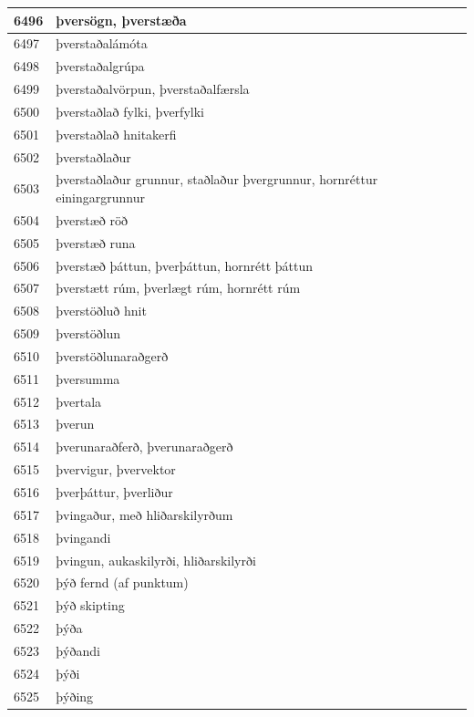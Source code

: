 \begin{longtable}{p{}|p{}|p{}|p{}|p{}}
6496 & þversögn, þverstæða &  &  &  \\
\hline
6497 & þverstaðalámóta &  &  &  \\
\hline
6498 & þverstaðalgrúpa &  &  &  \\
\hline
6499 & þverstaðalvörpun, þverstaðalfærsla &  &  &  \\
\hline
6500 & þverstaðlað fylki, þverfylki &  &  &  \\
\hline
6501 & þverstaðlað hnitakerfi &  &  &  \\
\hline
6502 & þverstaðlaður &  &  &  \\
\hline
6503 & þverstaðlaður grunnur, staðlaður þvergrunnur, hornréttur einingargrunnur &  &  &  \\
\hline
6504 & þverstæð röð &  &  &  \\
\hline
6505 & þverstæð runa &  &  &  \\
\hline
6506 & þverstæð þáttun, þverþáttun, hornrétt þáttun &  &  &  \\
\hline
6507 & þverstætt rúm, þverlægt rúm, hornrétt rúm &  &  &  \\
\hline
6508 & þverstöðluð hnit &  &  &  \\
\hline
6509 & þverstöðlun &  &  &  \\
\hline
6510 & þverstöðlunaraðgerð &  &  &  \\
\hline
6511 & þversumma &  &  &  \\
\hline
6512 & þvertala &  &  &  \\
\hline
6513 & þverun &  &  &  \\
\hline
6514 & þverunaraðferð, þverunaraðgerð &  &  &  \\
\hline
6515 & þvervigur, þvervektor &  &  &  \\
\hline
6516 & þverþáttur, þverliður &  &  &  \\
\hline
6517 & þvingaður, með hliðarskilyrðum &  &  &  \\
\hline
6518 & þvingandi &  &  &  \\
\hline
6519 & þvingun, aukaskilyrði, hliðarskilyrði &  &  &  \\
\hline
6520 & þýð fernd (af punktum) &  &  &  \\
\hline
6521 & þýð skipting &  &  &  \\
\hline
6522 & þýða &  &  &  \\
\hline
6523 & þýðandi &  &  &  \\
\hline
6524 & þýði &  &  &  \\
\hline
6525 & þýðing &  &  &  \\

\end{longtable}
